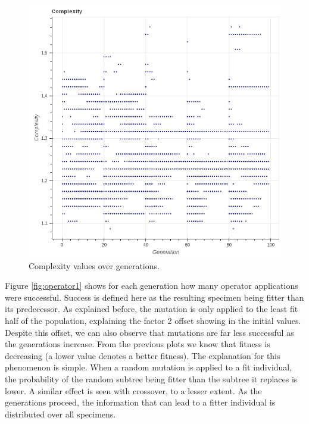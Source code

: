 \documentclass[10pt]{extarticle}
\begin{document}
\begin{figure}[H]
	\caption{Complexity values over generations.}
	\label{fig:comp1}
	\includegraphics[scale=0.3]{figures/complexity1.png}
\end{figure}
Figure \ref{fig:operator1} shows for each generation how many operator applications were successful. Success is defined here as the resulting specimen being fitter than its predecessor. 
As explained before, the mutation is only applied to the least fit half of the population, explaining the factor 2 offset showing in the initial values.
Despite this offset, we can also observe that mutations are far less successful as the generations increase. From the previous plots we know that fitness is decreasing (a lower value denotes a better fitness). The explanation for this phenomenon is simple. 
When a random mutation is applied to a fit individual, the probability of the random subtree being fitter than the subtree it replaces is lower. 
A similar effect is seen with crossover, to a lesser extent. As the generations proceed, the information that can lead to a fitter individual is distributed over all specimens.
\end{document}
